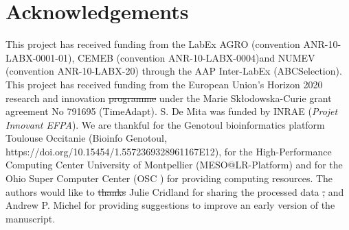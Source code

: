 \documentclass[a4paper, 12pt]{article}
\providecommand{\DIFaddtex}[1]{{\protect\color{blue}\uwave{#1}}} %
\providecommand{\DIFdeltex}[1]{{\protect\color{red}\sout{#1}}}                      %
\providecommand{\DIFaddbegin}{} %
\providecommand{\DIFaddend}{} %
\providecommand{\DIFdelbegin}{} %
\providecommand{\DIFdelend}{} %
\providecommand{\DIFadd}[1]{\texorpdfstring{\DIFaddtex{#1}}{#1}} %
\providecommand{\DIFdel}[1]{\texorpdfstring{\DIFdeltex{#1}}{}} %
\newcommand{\DIFscaledelfig}{0.5}
\newlength{\DIFdelgraphicswidth} %
\newlength{\DIFdelgraphicsheight} %
\newcommand{\DIFaddincludegraphics}[2][]{{\color{blue}\fbox{\DIFOincludegraphics[#1]{#2}}}} %
\newcommand{\DIFdelincludegraphics}[2][]{%
\sbox{\DIFdelgraphicsbox}{\DIFOincludegraphics[#1]{#2}}%
\settoboxwidth{\DIFdelgraphicswidth}{\DIFdelgraphicsbox} %
\settoboxtotalheight{\DIFdelgraphicsheight}{\DIFdelgraphicsbox} %
\scalebox{\DIFscaledelfig}{%
\parbox[b]{\DIFdelgraphicswidth}{\usebox{\DIFdelgraphicsbox}\\[-\baselineskip] \rule{\DIFdelgraphicswidth}{0em}}\llap{\resizebox{\DIFdelgraphicswidth}{\DIFdelgraphicsheight}{%
\setlength{\unitlength}{\DIFdelgraphicswidth}%
\begin{picture}(1,1)%
\thicklines\linethickness{2pt} %
{\color[rgb]{1,0,0}\put(0,0){\framebox(1,1){}}}%
{\color[rgb]{1,0,0}\put(0,0){\line( 1,1){1}}}%
{\color[rgb]{1,0,0}\put(0,1){\line(1,-1){1}}}%
\end{picture}%
}\hspace*{3pt}}} %
} %
\DeclareRobustCommand{\DIFaddbegin}{\DIFOaddbegin \let\includegraphics\DIFaddincludegraphics} %
\DeclareRobustCommand{\DIFaddend}{\DIFOaddend \let\includegraphics\DIFOincludegraphics} %
\DeclareRobustCommand{\DIFdelbegin}{\DIFOdelbegin \let\includegraphics\DIFdelincludegraphics} %
\DeclareRobustCommand{\DIFdelend}{\DIFOaddend \let\includegraphics\DIFOincludegraphics} %
\begin{document}
\section*{Acknowledgements}

This project has received funding from the LabEx AGRO (convention ANR-10-LABX-0001-01), CEMEB (convention ANR-10-LABX-0004)\DIFaddbegin \DIFadd{, }\DIFaddend and NUMEV (convention ANR-10-LABX-20) through the AAP Inter-LabEx (ABCSelection). This project has received funding from the European Union's Horizon 2020 research and innovation \DIFdelbegin \DIFdel{programme }\DIFdelend \DIFaddbegin \DIFadd{program }\DIFaddend under the Marie Skłodowska-Curie grant agreement No 791695 (TimeAdapt). S. De Mita was funded by INRAE (\textit{Projet Innovant EFPA}). We are thankful for the Genotoul bioinformatics platform Toulouse Occitanie (Bioinfo Genotoul, https://doi.org/10.15454/1.5572369328961167E12), for the High-Performance Computing Center University of Montpellier (MESO@LR-Platform) and for the Ohio Super Computer Center (OSC \citet{OhioSupercomputerCenter1987}) for providing computing resources. The authors would like to \DIFdelbegin \DIFdel{thanks }\DIFdelend \DIFaddbegin \DIFadd{thank }\DIFaddend Julie Cridland for sharing the processed data \DIFdelbegin \DIFdel{, }\DIFdelend and Andrew P. Michel for providing suggestions to improve an early version of the manuscript. 



\end{document}
